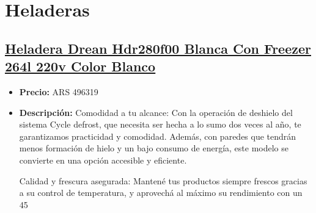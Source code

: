 \documentclass{article}
\begin{document}
\section*{Heladeras}
\setcounter{subsection}{0} %

\begin{adjustwidth}{2em}{}

\subsection{\uline{\href{https://www.mercadolibre.com.ar/heladera-drean-hdr280f00-blanca-con-freezer-264l-220v-color-blanco/p/MLA19879252}{Heladera Drean Hdr280f00 Blanca Con Freezer 264l 220v Color Blanco}}}
\begin{itemize}
    \item \textbf{Precio:} ARS 496319
    \item \textbf{Descripción:} Comodidad a tu alcance:
Con la operación de deshielo del sistema Cycle defrost, que necesita ser hecha a lo sumo dos veces al año, te garantizamos practicidad y comodidad. Además, con paredes que tendrán menos formación de hielo y un bajo consumo de energía, este modelo se convierte en una opción accesible y eficiente. 

Calidad y frescura asegurada:
Mantené tus productos siempre frescos gracias a su control de temperatura, y aprovechá al máximo su rendimiento con un 45%


\end{itemize}
\end{adjustwidth}
\end{document}
